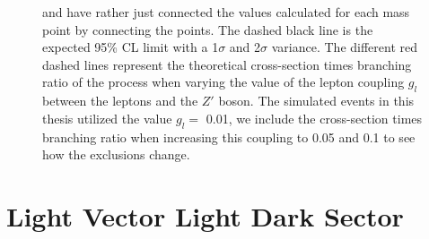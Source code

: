 \documentclass[12pt, a4paper]{book}
\begin{document}
\begin{figure}[!ht]
{   and have rather just connected the values calculated for each mass point by connecting the points. The dashed black line is the expected 95\% CL limit with a 1$\sigma$ and 2$\sigma$ variance. 
   The different red dashed lines represent the theoretical cross-section times branching ratio of the process when varying the value of the lepton coupling $g_l$ between the leptons and the $Z'$ boson. The simulated events in this thesis utilized the value $g_l=$ 0.01, we include the cross-section times branching ratio when increasing this coupling to 0.05 and 0.1 to see how the exclusions change.  }\label{fig:LV_HDS_me_SRS}
\end{figure}


\clearpage
\section{Light Vector Light Dark Sector}
\end{document}
